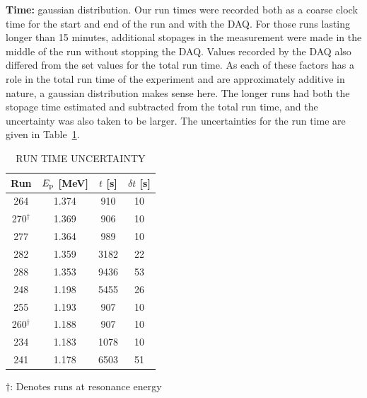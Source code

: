 \textbf{Time:} gaussian distribution. Our run times were recorded both
as a coarse clock time for the start and end of the run and with the
DAQ. For those runs lasting longer than 15 minutes, additional stopages
in the measurement were made in the middle of the run without stopping
the DAQ. Values recorded by the DAQ also differed from the set values
for the total run time. As each of these factors has a role in the total
run time of the experiment and are approximately additive in nature, a
gaussian distribution makes sense here. The longer runs had both the
stopage time estimated and subtracted from the total run time, and the
uncertainty was also taken to be larger. The uncertainties for the run
time are given in Table~\ref{tab:run-time-uncertainty}.

\begin{table}
    \begin{center}
        \caption{RUN TIME UNCERTAINTY}
        \label{tab:run-time-uncertainty}
        \begin{tabular}{cccc}
            \toprule
            \midrule
            \textbf{Run} & \textbf{$E_{\rm p}$ [MeV]} & \textbf{$t$ [s]}
                & \textbf{$\delta t$ [s]} \\
            \midrule
                264           & 1.374 &  910 & 10 \\
                270$^\dagger$ & 1.369 &  906 & 10 \\
                277           & 1.364 &  989 & 10 \\
                282           & 1.359 & 3182 & 22 \\
                288           & 1.353 & 9436 & 53 \\
                248           & 1.198 & 5455 & 26 \\
                255           & 1.193 &  907 & 10 \\
                260$^\dagger$ & 1.188 &  907 & 10 \\
                234           & 1.183 & 1078 & 10 \\
                241           & 1.178 & 6503 & 51 \\
            \bottomrule
        \end{tabular}

        \vspace{0.5em}
        $\dagger$: Denotes runs at resonance energy
    \end{center}
\end{table}

